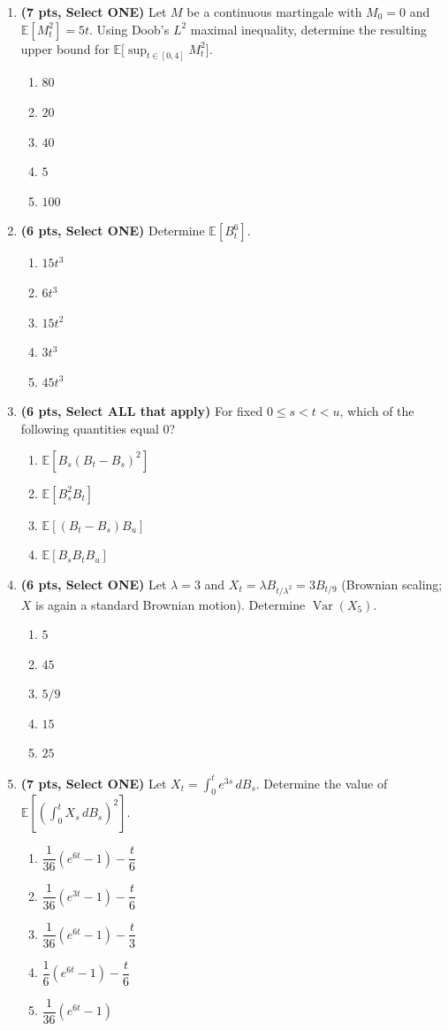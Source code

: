 \documentclass[11pt]{article}
\newcommand{\E}{\mathbb{E}}
\DeclareMathOperator{\Var}{Var}
\begin{document}
\begin{enumerate}
\item[\textbf{Q10.}] \textbf{(7 pts, Select ONE)} Let $M$ be a continuous martingale with $M_0=0$ and $\E[M_t^2]=5t$. Using Doob's $L^2$ maximal inequality, determine the resulting upper bound for $\E\big[\sup_{t\in[0,4]}M_t^2\big]$.
\begin{enumerate}
  \item $80$
  \item $20$
  \item $40$
  \item $5$
  \item $100$
\end{enumerate}

\item[\textbf{Q11.}] \textbf{(6 pts, Select ONE)} Determine $\E[B_t^6]$.
\begin{enumerate}
  \item $15t^3$
  \item $6t^3$
  \item $15t^2$
  \item $3t^3$
  \item $45t^3$
\end{enumerate}

\item[\textbf{Q12.}] \textbf{(6 pts, Select ALL that apply)} For fixed $0\le s<t<u$, which of the following quantities equal $0$?
\begin{enumerate}
  \item $\E[B_s(B_t-B_s)^2]$
  \item $\E[B_s^2B_t]$
  \item $\E[(B_t-B_s)B_u]$
  \item $\E[B_sB_tB_u]$
\end{enumerate}

\item[\textbf{Q13.}] \textbf{(6 pts, Select ONE)} Let $\lambda=3$ and $X_t=\lambda B_{t/\lambda^2}=3B_{t/9}$ (Brownian scaling; $X$ is again a standard Brownian motion). Determine $\Var(X_5)$.
\begin{enumerate}
  \item $5$
  \item $45$
  \item $5/9$
  \item $15$
  \item $25$
\end{enumerate}

\item[\textbf{Q14.}] \textbf{(7 pts, Select ONE)} Let $X_t=\int_0^te^{3s}\,dB_s$. Determine the value of $\displaystyle\E\left[\left(\int_0^tX_s\,dB_s\right)^2\right]$.
\begin{enumerate}
  \item $\dfrac1{36}(e^{6t}-1)-\dfrac t6$
  \item $\dfrac1{36}(e^{3t}-1)-\dfrac t6$
  \item $\dfrac1{36}(e^{6t}-1)-\dfrac t3$
  \item $\dfrac16(e^{6t}-1)-\dfrac t6$
  \item $\dfrac1{36}(e^{6t}-1)$
\end{enumerate}


\end{enumerate}
\end{document}
